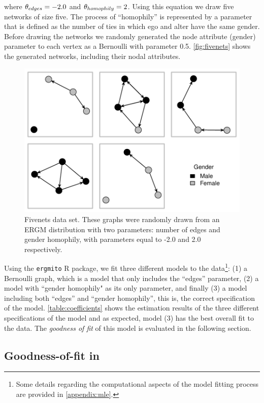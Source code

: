 \documentclass[12pt]{article}
\begin{document}
\noindent where $\theta_{edges} = -2.0$ and $\theta_{homophily} = 2$. Using this equation we draw five networks of size five. The process of ``homophily'' is represented by a parameter that is defined as the number of ties in which ego and alter have the same gender. Before drawing the networks we randomly generated the node attribute (gender) parameter to each vertex as a Bernoulli with parameter 0.5. \autoref{fig:fivenets} shows the generated networks, including their nodal attributes.

\begin{figure}[tb]
    \centering
    \includegraphics[width=.6\linewidth]{figures/fivenets_graphs.pdf}
    \caption{\label{fig:fivenets}Fivenets data set. These graphs were randomly drawn from an ERGM distribution with two parameters: number of edges and gender homophily, with parameters equal to -2.0 and 2.0 respectively.}
    \label{fig:my_label}
\end{figure}

Using the \texttt{ergmito} R package, we fit three different models to the data\footnote{Some details regarding the computational aspects of the model fitting process are provided in \ref{appendix:mle}.}: (1) a Bernoulli graph, which is a model that only includes the ``edges'' parameter, (2) a model with ``gender homophily" as its only parameter, and finally (3) a model including both ``edges'' and ``gender homophily'', this is, the correct specification of the model. \autoref{table:coefficients} shows the estimation results of the three different specifications of the model and as expected, model (3) has the best overall fit to the data. The \textit{goodness of fit} of this model is evaluated in the following section.



\subsection{Goodness-of-fit in \ergmitos}
\end{document}
